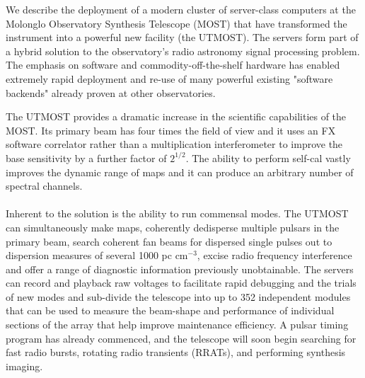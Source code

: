 We describe the deployment of a modern cluster of server-class computers at the Molonglo Observatory Synthesis Telescope (MOST) that have transformed the instrument into a powerful new facility (the UTMOST). The servers form part of a hybrid solution to the observatory's radio astronomy signal processing problem. The emphasis on software and commodity-off-the-shelf hardware has enabled extremely rapid deployment and re-use of many powerful existing "software backends" already proven at other observatories. 

The UTMOST provides a dramatic increase in the scientific capabilities of the MOST. Its primary beam has four times the field of view and it uses an FX software correlator rather than a multiplication interferometer to improve the base sensitivity by a further factor of $2^{1/2}$. The ability to perform self-cal vastly improves the dynamic range of maps and it can produce an arbitrary number of spectral channels.\\\\ Inherent to the solution is the ability to run commensal modes. The UTMOST can simultaneously make maps, coherently dedisperse multiple pulsars in the primary beam, search coherent fan beams for dispersed single pulses out to dispersion measures of several 1000 pc cm$^{-3}$, excise radio frequency interference and offer a range of diagnostic information previously unobtainable. The servers can record and playback raw voltages to facilitate rapid debugging and the trials of new modes and sub-divide the telescope into up to 352 independent modules that can be used to measure the beam-shape and performance of individual sections of the array that help improve maintenance efficiency. A pulsar timing program has already commenced, and the telescope will soon begin searching for fast radio bursts, rotating radio transients (RRATs), and performing synthesis imaging. 
